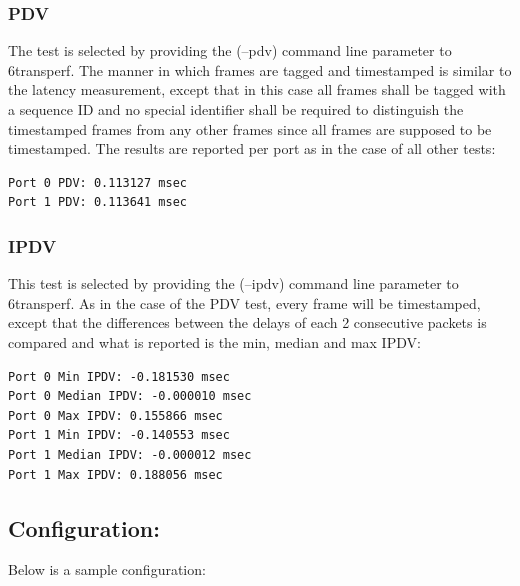 \documentclass[a4paper,12p,titlepage]{article}
\begin{document}
\subsubsection{PDV}

The test is selected by providing the (--pdv) command line parameter to 6transperf. The manner in which frames are tagged and timestamped is similar to the latency measurement, except that in this case all frames shall be tagged with a sequence ID and no special identifier shall be required to distinguish the timestamped frames from any other frames since all frames are supposed to be timestamped. The results are reported per port as in the case of all other tests:

\begin{lstlisting}
Port 0 PDV: 0.113127 msec
Port 1 PDV: 0.113641 msec
\end{lstlisting}

\subsubsection{IPDV}

This test is selected by providing the (--ipdv) command line parameter to 6transperf. As in the case of the PDV test, every frame will be timestamped, except that the differences between the delays of each 2 consecutive packets is compared and what is reported is the min, median and max IPDV:

\begin{lstlisting}
Port 0 Min IPDV: -0.181530 msec
Port 0 Median IPDV: -0.000010 msec
Port 0 Max IPDV: 0.155866 msec
Port 1 Min IPDV: -0.140553 msec
Port 1 Median IPDV: -0.000012 msec
Port 1 Max IPDV: 0.188056 msec
\end{lstlisting}

\subsection{Configuration:}


Below is a sample configuration:
\end{document}
